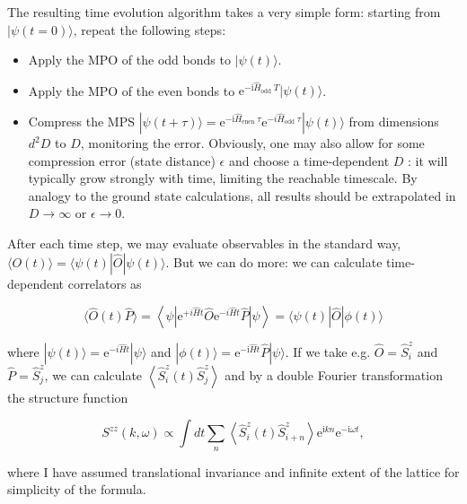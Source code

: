 \documentclass[12pt]{article}
\begin{document}
The resulting time evolution algorithm takes a very simple form: starting from $|\psi(t=0)\rangle$, repeat the following steps:

\begin{itemize}
  \item Apply the MPO of the odd bonds to $|\psi(t)\rangle$.
  \item Apply the MPO of the even bonds to $\mathrm{e}^{-\mathrm{i} \hat{H}_{\text {odd }} T}|\psi(t)\rangle$.
  \item Compress the MPS $|\psi(t+\tau)\rangle=\mathrm{e}^{-\mathrm{i} \hat{H}_{\text {enen }} \tau} \mathrm{e}^{-i \hat{H}_{\text {odd }} \tau}|\psi(t)\rangle$ from dimensions $d^{2} D$ to $D$, monitoring the error. Obviously, one may also allow for some compression error (state distance) $\epsilon$ and choose a time-dependent $D$ : it will typically grow strongly with time, limiting the reachable timescale. By analogy to the ground state calculations, all results should be extrapolated in $D \rightarrow \infty$ or $\epsilon \rightarrow 0$.
\end{itemize}

After each time step, we may evaluate observables in the standard way, $\langle O(t)\rangle=\langle\psi(t)|\hat{O}| \psi(t)\rangle$. But we can do more: we can calculate time-dependent correlators as


\begin{equation*}
\langle\hat{O}(t) \hat{P}\rangle=\left\langle\psi\left|\mathrm{e}^{+i \hat{H} t} \hat{O} \mathrm{e}^{-i \hat{H} t} \hat{P}\right| \psi\right\rangle=\langle\psi(t)|\hat{O}| \phi(t)\rangle \tag{227}
\end{equation*}


where $|\psi(t)\rangle=\mathrm{e}^{-i \hat{H} t}|\psi\rangle$ and $|\phi(t)\rangle=\mathrm{e}^{-\mathrm{i} \hat{H} t} \hat{P}|\psi\rangle$. If we take e.g. $\hat{O}=\hat{S}_{i}^{z}$ and $\hat{P}=\hat{S}_{j}^{z}$, we can calculate $\left\langle\hat{S}_{i}^{z}(t) \hat{S}_{j}^{z}\right\rangle$ and by a double Fourier transformation the structure function


\begin{equation*}
S^{z z}(k, \omega) \propto \int d t \sum_{n}\left\langle\hat{S}_{i}^{z}(t) \hat{S}_{i+n}^{z}\right\rangle \mathrm{e}^{\mathrm{i} k n} \mathrm{e}^{-\mathrm{i} \omega t}, \tag{228}
\end{equation*}


where I have assumed translational invariance and infinite extent of the lattice for simplicity of the formula.
\end{document}
